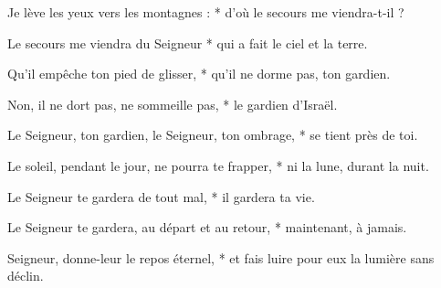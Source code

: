 \item Je lève les yeux vers les montagnes : * d'où le secours me viendra-t-il ?

\item Le secours me viendra du Seigneur * qui a fait le ciel et la terre.

\item Qu'il empêche ton pied de glisser, * qu'il ne dorme pas, ton gardien.

\item Non, il ne dort pas, ne sommeille pas, * le gardien d'Israël.

\item Le Seigneur, ton gardien, le Seigneur, ton ombrage, * se tient près de toi.

\item Le soleil, pendant le jour, ne pourra te frapper, * ni la lune, durant la nuit.

\item Le Seigneur te gardera de tout mal, * il gardera ta vie.

\item Le Seigneur te gardera, au départ et au retour, * maintenant, à jamais.

\item Seigneur, donne-leur le repos éternel, * et fais luire pour eux la lumière sans déclin.